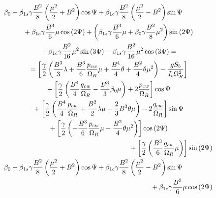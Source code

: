 \begin{gather}
  \label{eq-aero-flapping-coefs-ccw-3}
  \begin{multlined}[0.88\textwidth]
    \beta_0
    + 
    \beta_{1s} \gamma \frac{B^2}{8}
    \left( \frac{\mu^2}{2} + B^2 \right) \cos \Psi
    +
    \beta_{1c} \gamma \frac{B^2}{8}
    \left( \frac{\mu^2}{2} - B^2 \right) \sin \Psi
    \\
    +
    \beta_{1c} \gamma \frac{B^3}{6} \mu \cos \left( 2 \Psi \right)
    +
    \left(
        \beta_{1s} \gamma \frac{B^3}{6} \mu
      + \beta_0 \gamma \frac{B^2}{8} \mu^2
    \right) \sin \left( 2 \Psi \right)
    \\
    +
    \beta_{1c} \gamma \frac{B^2}{16} \mu^2 \sin \left( 3 \Psi \right)
    -
    \beta_{1s} \gamma \frac{B^2}{16} \mu^2 \cos \left( 3 \Psi \right)
    = \\ =
    \left[
      \frac{\gamma}{2}
      \left(
          \frac{B^3}{3} \lambda
        + \frac{B^3}{6} \frac{p_{cw}}{\Omega_R} \mu
        + \frac{B^4}{4} \theta
        + \frac{B^2}{4} \theta \mu^2
      \right) - \frac{ g S_b }{ I_b \Omega_R^2 }
    \right]
    \\
    + \left[
      \frac{\gamma}{2}
      \left(
          \frac{B^4}{4} \frac{q_{cw}}{\Omega_R}
        - \frac{B^3}{3} \beta_0 \mu
      \right) + 2 \frac{p_{cw}}{\Omega_R}
    \right] \cos \Psi
    \\
    + \left[
      \frac{\gamma}{2}
      \left(
          \frac{B^4}{4} \frac{p_{cw}}{\Omega_R}
        + \frac{B^2}{2} \lambda \mu
        + \frac{2}{3} B^3 \theta \mu
        \right) - 2 \frac{q_{cw}}{\Omega_R}
    \right] \sin \Psi
    \\
    + \left[
      \frac{\gamma}{2}
      \left(
        - \frac{B^3}{6} \frac{p_{cw}}{\Omega_R} \mu
        - \frac{B^2}{4} \theta \mu^2
      \right)
    \right] \cos \left( 2 \Psi \right)
    \\
    + \left[
      \frac{\gamma}{2}
      \left( \frac{B^3}{6} \frac{q_{cw}}{\Omega_R} \mu \right)
    \right] \sin \left( 2 \Psi \right)
  \end{multlined}
  \\
  \label{eq-aero-flapping-coefs-cw-3}
  \begin{multlined}[0.88\textwidth]
    \beta_0
    + 
    \beta_{1s} \gamma \frac{B^2}{8}
    \left( \frac{\mu^2}{2} + B^2 \right) \cos \Psi
    +
    \beta_{1c} \gamma \frac{B^2}{8}
    \left( \frac{\mu^2}{2} - B^2 \right) \sin \Psi
    \\
    +
    \beta_{1c} \gamma \frac{B^3}{6} \mu \cos \left( 2 \Psi \right)

\end{multlined}
\end{gather}
